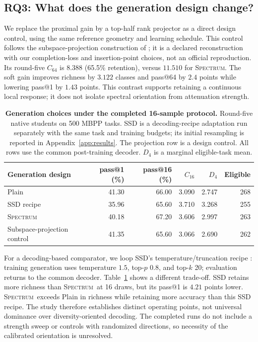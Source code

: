 \documentclass{article}
\newcommand{\method}{\textsc{Spectrum}}
\begin{document}
\subsection{RQ3: What does the generation design change?}
\label{sec:rq3}
We replace the proximal gain by a top-half rank projector as a direct design control, using the same reference geometry and learning schedule. This control follows the subspace-projection construction of \citet{hao2026spd}; it is a declared reconstruction with our completion-loss and insertion-point choices, not an official reproduction. Its round-five $C_{64}$ is $8.388$ (65.5\% retention), versus $11.510$ for \method. The soft gain improves richness by $3.122$ classes and pass@64 by $2.4$ points while lowering pass@1 by $1.43$ points. This contrast supports retaining a continuous local response; it does not isolate spectral orientation from attenuation strength.

\begin{table}[t]
\centering\small
\caption{\textbf{Generation choices under the completed 16-sample protocol.} Round-five native students on 500 MBPP tasks. SSD is a decoding-recipe adaptation run separately with the same task and training budgets; its initial resampling is reported in Appendix~\ref{app:results}. The projection row is a design control. All rows use the common post-training decoder. $D_4$ is a marginal eligible-task mean.}
\label{tab:design}
\begin{tabular}{lrrrrr}
\toprule
Generation design & pass@1 (\%) & pass@16 (\%) & $C_{16}$ & $D_4$ & Eligible\\
\midrule
Plain &41.30&66.00&3.090&2.747&268\\
SSD recipe &35.96&65.60&3.710&3.268&255\\
\method &40.18&67.20&3.606&2.997&263\\
\midrule
Subspace-projection control &41.35&65.60&3.066&2.690&262\\
\bottomrule
\end{tabular}
\end{table}

For a decoding-based comparator, we loop SSD's temperature/truncation recipe \citep{zhang2026ssd}: training generation uses temperature $1.5$, top-$p$ $0.8$, and top-$k$ 20; evaluation returns to the common decoder. Table~\ref{tab:design} shows a different trade-off. SSD retains more richness than \method\ at 16 draws, but its pass@1 is $4.21$ points lower. \method\ exceeds Plain in richness while retaining more accuracy than this SSD recipe. The study therefore establishes distinct operating points, not universal dominance over diversity-oriented decoding. The completed runs do not include a strength sweep or controls with randomized directions, so necessity of the calibrated orientation is unresolved.
\end{document}
